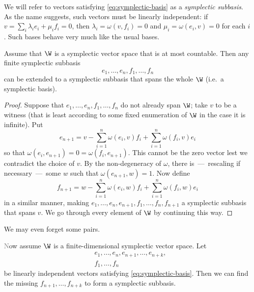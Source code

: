 We will refer to vectors satisfying \eqref{eq:symplectic-basis} as a \emph{symplectic subbasis}. 
As the name suggests, such vectors must be linearly independent:
if $v = \sum_i \lambda_i e_i + \mu_i f_i = 0$, then $\lambda_i = \omega(v, f_i) = 0$ and $\mu_i = \omega(e_i, v) = 0$ for each $i$.
Such bases behave very much like the usual bases.

\begin{proposition}\label{prop:symplectic-basis}
    Assume that $\W$ is a symplectic vector space that is at most countable.
    Then any finite symplectic subbasis \[
        e_1, \ldots, e_n, f_1, \ldots, f_n
    \] 
    can be extended to a symplectic subbasis that spans the whole $\W$ (i.e.~a symplectic basis).
\end{proposition}
\begin{proof}
    Suppose that $e_1, \ldots, e_n, f_1, \ldots, f_n$ do not already span $\W$;
    take $v$ to be a witness (that is least according to some fixed enumeration of $\W$ 
    in the case it is infinite).
    Put
    \[
        e_{n+1} = v - \sum_{i=1}^n \omega(e_i, v) f_i + \sum_{i=1}^n \omega(f_i, v) e_i
    \]
    so that $\omega(e_i, e_{n+1}) = 0 = \omega(f_i, e_{n+1})$.
    This cannot be the zero vector lest we contradict the choice of $v$.
    By the non-degeneracy of $\omega$, there is~---~rescaling if necessary~---~some $w$ such that $\omega(e_{n+1}, w) = 1$. 
    Now define
    \[
        f_{n+1} = w - \sum_{i=1}^n \omega(e_i, w) f_i + \sum_{i=1}^n \omega(f_i, w) e_i
    \]
    in a similar manner, 
    making $e_1, \ldots, e_n, e_{n+1}, f_1, \ldots, f_n, f_{n+1}$ a symplectic subbasis that spans $v$.
    We go through every element of $\W$ by continuing this way.
\end{proof}

We may even forget some pairs.
\begin{proposition}\label{prop:symplectic-basis-and-a-half}\textcolor{gray}
    Now assume $\W$ is a finite-dimensional symplectic vector space.
    Let 
    \begin{align*} 
        &e_1, \ldots, e_n, e_{n+1}, \ldots, e_{n+k}, \\
        &f_1, \ldots, f_n
    \end{align*}
    be linearly independent vectors satisfying \eqref{eq:symplectic-basis}.
    Then we can find the missing $f_{n+1}, \ldots, f_{n+k}$ to form a symplectic subbasis.
\end{proposition}
\color{black}

